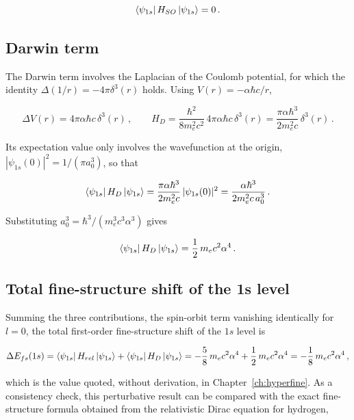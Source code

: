 \begin{appendices}
\begin{equation}
\bra{\psi_{1s}} H_{SO} \ket{\psi_{1s}} = 0 \, .
\end{equation}

\subsection*{Darwin term}

The Darwin term involves the Laplacian of the Coulomb potential, for which the identity $\Delta(1/r) = -4\pi \delta^3(r)$ holds. Using $V(r) = -\alpha\hbar c/r$,

\begin{equation}
\Delta V(r) = 4\pi \alpha \hbar c\, \delta^3(r) \, , \qquad H_D = \frac{\hbar^2}{8m_e^2c^2}\, 4\pi\alpha\hbar c\, \delta^3(r) = \frac{\pi \alpha \hbar^3}{2 m_e^2 c}\, \delta^3(r) \, .
\end{equation}

Its expectation value only involves the wavefunction at the origin, $|\psi_{1s}(0)|^2 = 1/(\pi a_0^3)$, so that

\begin{equation}
\bra{\psi_{1s}} H_D \ket{\psi_{1s}} = \frac{\pi \alpha \hbar^3}{2 m_e^2 c} \, |\psi_{1s}(0)|^2 = \frac{\alpha \hbar^3}{2 m_e^2 c\, a_0^3} \, .
\end{equation}

Substituting $a_0^3 = \hbar^3/(m_e^3c^3\alpha^3)$ gives

\begin{equation}
\bra{\psi_{1s}} H_D \ket{\psi_{1s}} = \frac{1}{2}\, m_e c^2 \alpha^4 \, .
\end{equation}

\subsection*{Total fine-structure shift of the 1s level}

Summing the three contributions, the spin-orbit term vanishing identically for $l=0$, the total first-order fine-structure shift of the $1s$ level is

\begin{equation} \label{eq:fs1s}
\Delta E_{fs}(1s) = \bra{\psi_{1s}} H_{rel} \ket{\psi_{1s}} + \bra{\psi_{1s}} H_{D} \ket{\psi_{1s}} = -\frac{5}{8}\, m_e c^2 \alpha^4 + \frac{1}{2}\, m_e c^2 \alpha^4 = -\frac{1}{8}\, m_e c^2 \alpha^4 \, ,
\end{equation}

which is the value quoted, without derivation, in Chapter~\ref{ch:hyperfine}. As a consistency check, this perturbative result can be compared with the exact fine-structure formula obtained from the relativistic Dirac equation for hydrogen,


\end{appendices}

